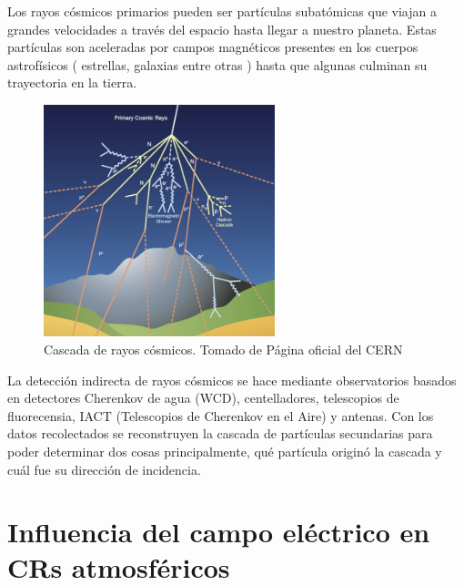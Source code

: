 \documentclass[12pt,a4paper,oneside]{book}
\begin{document}
Los rayos cósmicos primarios pueden ser partículas subatómicas que viajan a grandes velocidades a través del espacio hasta llegar a nuestro planeta. Estas partículas son aceleradas por campos magnéticos presentes en los cuerpos astrofísicos ( estrellas, galaxias entre otras ) hasta que algunas culminan su trayectoria en la tierra. \medskip





\begin{figure}[ht]
  \centering
  \includegraphics[width=0.6\textwidth]{c.jpg}
  \caption{Cascada de rayos cósmicos. Tomado de Página oficial del CERN}
  \label{fig1}
\end{figure}


La detección indirecta de rayos cósmicos se hace mediante observatorios basados en detectores Cherenkov de agua (WCD), centelladores, telescopios de fluorecensia, IACT (Telescopios de Cherenkov en el Aire) y antenas. Con los datos recolectados se reconstruyen la cascada de partículas secundarias para poder determinar dos cosas principalmente, qué partícula originó la cascada y cuál fue su dirección de incidencia. \medskip


\section{Influencia del campo eléctrico en CRs atmosféricos }
\end{document}

